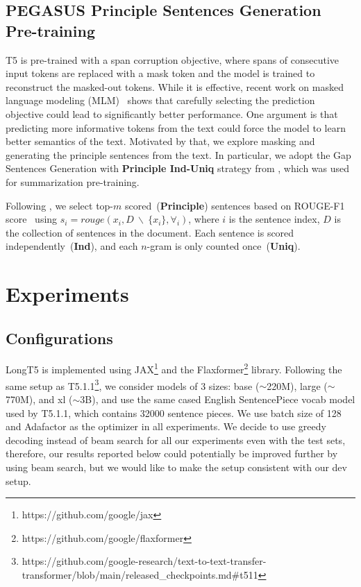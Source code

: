 \documentclass[11pt]{article}
\begin{document}
\subsection{PEGASUS Principle Sentences Generation Pre-training}
\label{sec:pegasus}
T5 is pre-trained with a span corruption objective, where spans of consecutive input tokens are replaced with a mask token and the model is trained to reconstruct the masked-out tokens.
While it is effective, recent work on masked language modeling (MLM)~\cite{liu2019roberta,zhang-etal-2019-ernie} shows that carefully selecting the prediction objective could lead to significantly better performance. 
One argument is that predicting more informative tokens from the text could force the model to learn better semantics of the text. 
Motivated by that, we explore masking and generating the principle sentences from the text.
In particular, we adopt the Gap Sentences Generation with \textbf{Principle Ind-Uniq} strategy from \citet{pegasus}, which was used for summarization pre-training.

Following \citet{pegasus}, we select top-$m$ scored~(\textbf{Principle}) sentences based on ROUGE-F1 score~\cite{lin-2004-rouge} using $s_i = rouge(x_i, D~\backslash~\{x_i\}, \forall_i)$,
where $i$ is the sentence index, $D$ is the collection of sentences in the document.
Each sentence is scored independently~(\textbf{Ind}), and each $n$-gram is only counted once~(\textbf{Uniq}).



\section{Experiments}\label{sec:experiments}
\subsection{Configurations}
LongT5 is implemented using JAX\footnote{https://github.com/google/jax} and the Flaxformer\footnote{https://github.com/google/flaxformer} library. Following the same setup as T5.1.1\footnote{https://github.com/google-research/text-to-text-transfer-transformer/blob/main/released\_checkpoints.md\#t511}, we consider models of 3 sizes: base ($\sim$220M), large ($\sim$770M), and xl ($\sim$3B), 
and use the same cased English SentencePiece vocab model used by T5.1.1, which contains 32000 sentence pieces. We use batch size of 128 and Adafactor as the optimizer in all experiments. We decide to use greedy decoding instead of beam search for all our experiments even with the test sets, therefore, our results reported below could potentially be improved further by using beam search, but we would like to make the setup consistent with our dev setup.
\end{document}
